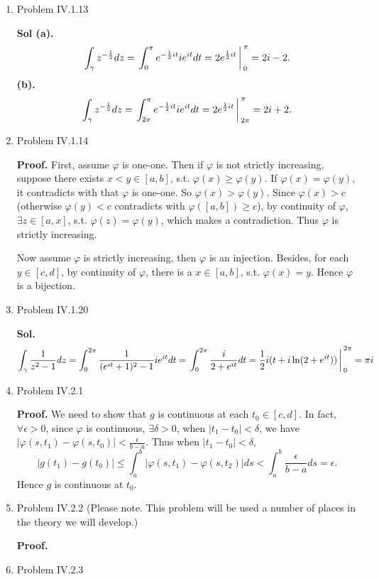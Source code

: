 \documentclass{article}%
\begin{document}
\begin{enumerate}
\item Problem IV.1.13

\textbf{Sol (a).} 
$$
\int_{\gamma}z^{-\frac{1}{2}}dz = \left.\int_{0}^{\pi}e^{-\frac{1}{2}it}ie^{it}dt = 2e^{\frac{1}{2}it}\right\arrowvert_{0}^{\pi} = 2i-2.
$$
\textbf{(b).}
$$
\int_{\gamma}z^{-\frac{1}{2}}dz = \left.\int_{2\pi}^{\pi}e^{-\frac{1}{2}it}ie^{it}dt = 2e^{\frac{1}{2}it}\right\arrowvert_{2\pi}^{\pi} = 2i+2.
$$

\item Problem IV.1.14

\textbf{Proof.} First, assume $\varphi$ is one-one. Then if $\varphi$ is not strictly increasing, suppose there exists $x < y \in [a, b]$, s.t. $\varphi(x) \ge \varphi(y)$. If $\varphi(x) = \varphi(y)$, it contradicts with that $\varphi$ is one-one. So $\varphi(x) > \varphi(y)$. Since $\varphi(x) > c$ (otherwise $\varphi(y) < c$ contradicts with $\varphi([a, b]) \ge c$), by continuity of $\varphi$, $\exists z \in [a, x]$, s.t. $\varphi(z) = \varphi(y)$, which makes a contradiction. Thus $\varphi$ is strictly increasing.

Now assume $\varphi$ is strictly increasing, then $\varphi$ is an injection. Besides, for each $y\in [c, d]$, by continuity of $\varphi$, there is a $x\in[a, b]$, s.t. $\varphi(x) = y$. Hence $\varphi$ is a bijection.

\item Problem IV.1.20

\textbf{Sol.} 
$$
\int_{\gamma}\frac{1}{z^2-1}dz = \int_{0}^{2\pi}\frac{1}{(e^{it}+1)^2-1}ie^{it}dt = \left.\int_{0}^{2\pi}\frac{i}{2+e^{it}}dt = \frac{1}{2}i(t+i\ln(2+e^{it}))\right\arrowvert_{0}^{2\pi} = \pi i
$$

\item Problem IV.2.1

\textbf{Proof.} We need to show that $g$ is continuous at each $t_0\in[c, d] $. In fact, $\forall \epsilon > 0$, since $\varphi$ is continuous, $\exists \delta > 0$, when $|t_1-t_0| < \delta $, we have $|\varphi(s, t_1)-\varphi(s, t_0)| < \frac{\epsilon}{b-a}$. Thus when $|t_1-t_0| < \delta $,
$$
|g(t_1)-g(t_0)| \le \int_{a}^{b}|\varphi(s, t_1)-\varphi(s, t_2)|ds < \int_{a}^{b}\frac{\epsilon}{b-a}ds = \epsilon.
$$
Hence $g$ is continuous at $t_0 $.

\item Problem IV.2.2  (Please note.  This problem will be used a number of places in the theory we will develop.)

\textbf{Proof.} 

\item Problem IV.2.3

\end{enumerate}
\end{document}
